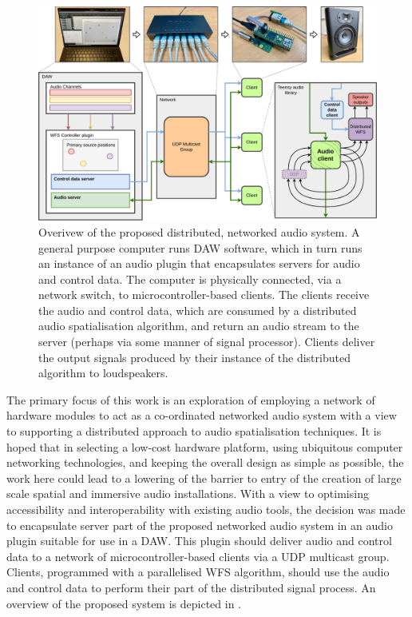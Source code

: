 \begin{figure}[ht]
    \centering
    \includegraphics[width=\textwidth]{figures/system_overview}
    \caption{
        Overivew of the proposed distributed, networked audio system.
        A general purpose computer runs DAW software, which in turn runs an
        instance of an audio plugin that encapsulates servers for audio and
        control data.
        The computer is physically connected, via a network switch, to
        microcontroller-based clients.
        The clients receive the audio and control data, which are consumed by
        a distributed audio spatialisation algorithm, and return an audio stream
        to the server (perhaps via some manner of signal processor).
        Clients deliver the output signals produced by their instance of the
        distributed algorithm to loudspeakers.
    }
    \label{fig:system-overview}
\end{figure}

The primary focus of this work is an exploration of employing a network of
hardware modules to act as a co-ordinated networked audio system with a view to
supporting a distributed approach to audio spatialisation techniques.
It is hoped that in selecting a low-cost hardware platform, using ubiquitous
computer networking technologies, and keeping the overall design as simple as
possible, the work here could lead to a lowering of the barrier to entry of
the creation of large scale spatial and immersive audio installations.
With a view to optimising accessibility and interoperability with existing audio
tools, the decision was made to encapsulate server part of the proposed
networked audio system in an audio plugin suitable for use in a DAW\@.
This plugin should deliver audio and control data to a network of
microcontroller-based clients via a UDP multicast group.
Clients, programmed with a parallelised WFS algorithm, should use the audio and
control data to perform their part of the distributed signal process.
An overview of the proposed system is depicted in .

